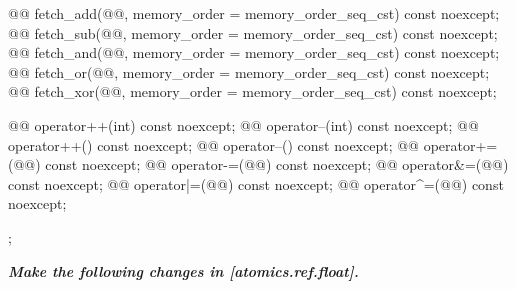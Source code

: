 \begin{codeblock}
{{    @@ fetch_add(@@,
                       memory_order = memory_order_seq_cst) const noexcept;
    @@ fetch_sub(@@,
                       memory_order = memory_order_seq_cst) const noexcept;
    @@ fetch_and(@@,
                       memory_order = memory_order_seq_cst) const noexcept;
    @@ fetch_or(@@,
                      memory_order = memory_order_seq_cst) const noexcept;
    @@ fetch_xor(@@,
                       memory_order = memory_order_seq_cst) const noexcept;

    @@ operator++(int) const noexcept;
    @@ operator--(int) const noexcept;
    @@ operator++() const noexcept;
    @@ operator--() const noexcept;
    @@ operator+=(@@) const noexcept;
    @@ operator-=(@@) const noexcept;
    @@ operator&=(@@) const noexcept;
    @@ operator|=(@@) const noexcept;
    @@ operator^=(@@) const noexcept;
  };
}
\end{codeblock}

\textbf{\textit{Make the following changes in [atomics.ref.float].}} \\

